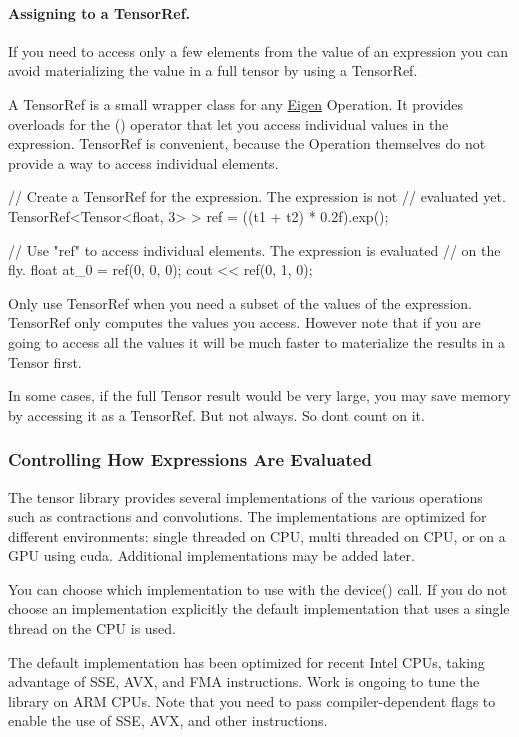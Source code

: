 \paragraph*{Assigning to a Tensor\+Ref.}

If you need to access only a few elements from the value of an expression you can avoid materializing the value in a full tensor by using a Tensor\+Ref.

A Tensor\+Ref is a small wrapper class for any \hyperlink{namespace_eigen}{Eigen} Operation. It provides overloads for the {\ttfamily ()} operator that let you access individual values in the expression. Tensor\+Ref is convenient, because the Operation themselves do not provide a way to access individual elements. \begin{DoxyVerb}// Create a TensorRef for the expression.  The expression is not
// evaluated yet.
TensorRef<Tensor<float, 3> > ref = ((t1 + t2) * 0.2f).exp();

// Use "ref" to access individual elements.  The expression is evaluated
// on the fly.
float at_0 = ref(0, 0, 0);
cout << ref(0, 1, 0);
\end{DoxyVerb}


Only use Tensor\+Ref when you need a subset of the values of the expression. Tensor\+Ref only computes the values you access. However note that if you are going to access all the values it will be much faster to materialize the results in a Tensor first.

In some cases, if the full Tensor result would be very large, you may save memory by accessing it as a Tensor\+Ref. But not always. So don\textquotesingle{}t count on it.

\subsubsection*{Controlling How Expressions Are Evaluated}

The tensor library provides several implementations of the various operations such as contractions and convolutions. The implementations are optimized for different environments\+: single threaded on C\+PU, multi threaded on C\+PU, or on a G\+PU using cuda. Additional implementations may be added later.

You can choose which implementation to use with the {\ttfamily device()} call. If you do not choose an implementation explicitly the default implementation that uses a single thread on the C\+PU is used.

The default implementation has been optimized for recent Intel C\+P\+Us, taking advantage of S\+SE, A\+VX, and F\+MA instructions. Work is ongoing to tune the library on A\+RM C\+P\+Us. Note that you need to pass compiler-\/dependent flags to enable the use of S\+SE, A\+VX, and other instructions.

